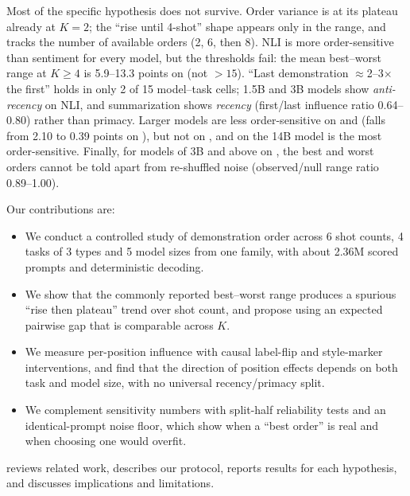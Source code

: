 Most of the specific hypothesis does not survive.
Order variance is at its plateau already at $K=2$; the ``rise until 4-shot'' shape appears only in the range, and tracks the number of available orders (2, 6, then 8).
NLI is more order-sensitive than sentiment for every model, but the thresholds fail: the mean best--worst range at $K\geq4$ is 5.9--13.3 points on \mnli (not $>15$).
``Last demonstration $\approx$2--3$\times$ the first'' holds in only 2 of 15 model--task cells; 1.5B and 3B models show \emph{anti-recency} on NLI, and summarization shows \emph{recency} (first/last influence ratio 0.64--0.80) rather than primacy.
Larger models are less order-sensitive on \sst and \rte (\pgap falls from 2.10 to 0.39 points on \sst), but not on \mnli, and on \samsum the 14B model is the most order-sensitive.
Finally, for models of 3B and above on \sst, the best and worst orders cannot be told apart from re-shuffled noise (observed/null range ratio 0.89--1.00).

Our contributions are:
\begin{itemize}[leftmargin=*,itemsep=0pt,topsep=0pt]
    \item We conduct a controlled study of demonstration order across 6 shot counts, 4 tasks of 3 types and 5 model sizes from one family, with about 2.36M scored prompts and deterministic decoding.
    \item We show that the commonly reported best--worst range produces a spurious ``rise then plateau'' trend over shot count, and propose using an expected pairwise gap that is comparable across $K$.
    \item We measure per-position influence with causal label-flip and style-marker interventions, and find that the direction of position effects depends on both task and model size, with no universal recency/primacy split.
    \item We complement sensitivity numbers with split-half reliability tests and an identical-prompt noise floor, which show when a ``best order'' is real and when choosing one would overfit.
\end{itemize}

 reviews related work,  describes our protocol,  reports results for each hypothesis, and  discusses implications and limitations.

